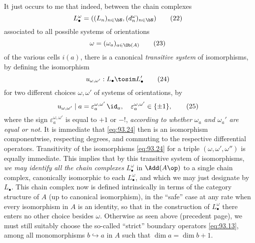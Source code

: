 It just occurs to me that indeed, between the chain
complexes
\begin{equation}
  \label{eq:93.22}
  L_\bullet^\omega = ((L_n)_{n\in\bN},(d_n^\omega)_{n\in\bN})\tag{22}
\end{equation}
associated to all possible systems of orientations
\begin{equation}
  \label{eq:93.23}
  \omega=(\omega_a)_{a\in\Ob(A)}\tag{23}
\end{equation}
of the various cells $i(a)$, there is a canonical \emph{transitive
  system} of isomorphisms, by defining the isomorphism
\begin{equation}
  \label{eq:93.24}
  u_{\omega,\omega'}:L_\bullet \tosim L_\bullet'\tag{24}
\end{equation}
for two different choices $\omega,\omega'$ of systems of orientations,
by
\begin{equation}
  \label{eq:93.25}
  u_{\omega,\omega'} \mid a=\varepsilon_a^{\omega,\omega'}\,
  \id_a,\quad \varepsilon_a^{\omega,\omega'}\in\{\pm1\},\tag{25}
\end{equation}
where the sign $\varepsilon_a^{\omega,\omega'}$ is equal to $+1$ or
$-!$, \emph{according to whether $\omega_a$ and $\omega_a'$ are equal
  or not}. It is immediate that \eqref{eq:93.24} then is an
isomorphism componentwise, respecting degrees, and commuting to the
respective differential operators. Transitivity of the isomorphisms
\eqref{eq:93.24} for a triple $(\omega,\omega',\omega'')$ is equally
immediate. This implies that by this transitive system of
isomorphisms, \emph{we may identify all the chain complexes}
$L_\bullet^\omega$ in $\Add(A\op)$ to a single chain complex,
canonically isomorphic to each $L_\bullet^\omega$, and which we may
just designate by $L_\bullet$. This chain complex now is defined
intrinsically in terms of the category structure of $A$ (up to
canonical isomorphism), in the ``safe'' case at any rate when every
isomorphism in $A$ is an identity, so that in the construction of
$L_\bullet^\omega$ there enters no other choice besides
$\omega$. Otherwise as seen above (precedent page), we must still
suitably choose the so-called ``strict'' boundary operators
\eqref{eq:93.13}, among all monomorphisms $b\hookrightarrow a$ in $A$
such that $\dim a=\dim b+1$.

